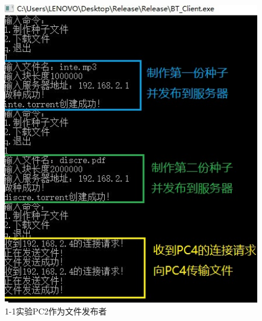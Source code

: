 \documentclass[thesis]{thesis}
\begin{document}
	\begin{minipage}{0.5\linewidth}
	\begin{figure}[H]
		\centering
		\includegraphics[width=\linewidth]{fig/PC2_11.jpg}
		\caption{1-1实验\quad PC2作为文件发布者}
		\label{res:PC2_11}
	\end{figure}
	\end{minipage}
\end{document}
